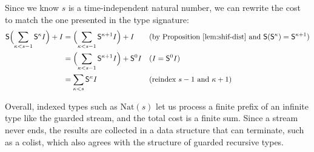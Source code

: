 Since we know $s$ is a time-independent natural number, we can rewrite the cost to match the one presented in the type signature:
\[
\begin{aligned}
\mathsf{S}\Bigl(\sum_{\kappa<s-1}\mathsf{S}^\kappa I\Bigr) + I 
  &= \Bigl(\sum_{\kappa<s-1}\mathsf{S}^{\kappa+1} I\Bigr) + I && (\text{by Proposition~\ref{lem:shif-dist} and } \mathsf{S}(\mathsf{S}^{\kappa}) = \mathsf{S}^{\kappa+1})\\
  &= \Bigl(\sum_{\kappa<s-1}\mathsf{S}^{\kappa+1} I\Bigr) + \mathsf{S}^0 I && (I = \mathsf{S}^{0}I) \\
  &= \sum_{\kappa<s}\mathsf{S}^\kappa I && (\text{reindex } s-1 \text{ and } \kappa +1) 
\end{aligned}
\]

Overall, indexed types such as $\mathrm{Nat}(s)$ let us process a finite prefix
of an infinite type like the guarded stream, and the total cost is a finite sum. Since
a stream never ends, the results are collected in a data structure that can terminate,
such as a colist, which also agrees with the structure of guarded recursive types.

\clearpage
\endgroup
